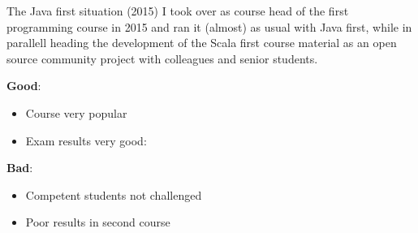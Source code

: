 \documentclass[aspectratio=169]{beamer}
\newenvironment{Slide}[1]%
  {\begin{frame}[environment=Slide]{#1}}
  {\end{frame}}%
\begin{document}
\begin{Slide}{The Java first situation (2015)}
  I took over as course head of the first programming course in 2015 and ran it (almost) as usual with Java first, while in parallell heading the development of the Scala first course material as an open source community project with colleagues and senior students.

  \vspace{1em}%
  \begin{minipage}[t]{0.45\textwidth}
      \textbf{Good}:
      \begin{itemize}
        \item Course very popular
        \item Exam results very good:  
      
      \end{itemize}
    \end{minipage}%
    \begin{minipage}[t]{0.50\textwidth}
      \textbf{Bad}:
      \begin{itemize}
        \item Competent students not challenged
        \item Poor results in second course
      \end{itemize}    
    \end{minipage}
\end{Slide}
\end{document}
